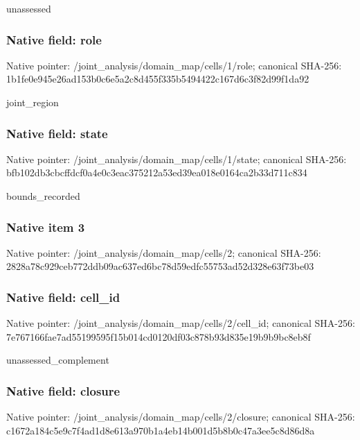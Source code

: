 \documentclass[10pt,a4paper]{article}
\begin{document}
\begingroup\raggedright\sloppy unassessed\par\endgroup

\subsubsection{Native field: role}
Native pointer: /joint\_\allowbreak{}analysis/domain\_\allowbreak{}map/cells/1/role; canonical SHA-256: 1b1fe0e945e26ad153b0c6e5a2c8d455f335b5494422c167d6c3f82d99f1da92

\begingroup\raggedright\sloppy joint\_\allowbreak{}region\par\endgroup

\subsubsection{Native field: state}
Native pointer: /joint\_\allowbreak{}analysis/domain\_\allowbreak{}map/cells/1/state; canonical SHA-256: bfb102db3cbcffdcf0a4e0c3eac375212a53ed39ea018e0164ca2b33d711c834

\begingroup\raggedright\sloppy bounds\_\allowbreak{}recorded\par\endgroup

\subsubsection{Native item 3}
Native pointer: /joint\_\allowbreak{}analysis/domain\_\allowbreak{}map/cells/2; canonical SHA-256: 2828a78c929ceb772ddb09ac637ed6bc78d59edfc55753ad52d328e63f73be03

\subsubsection{Native field: cell\_\allowbreak{}id}
Native pointer: /joint\_\allowbreak{}analysis/domain\_\allowbreak{}map/cells/2/cell\_\allowbreak{}id; canonical SHA-256: 7e767166fae7ad55199595f15b014cd0120df03c878b93d835e19b9b9bc8eb8f

\begingroup\raggedright\sloppy unassessed\_\allowbreak{}complement\par\endgroup

\subsubsection{Native field: closure}
Native pointer: /joint\_\allowbreak{}analysis/domain\_\allowbreak{}map/cells/2/closure; canonical SHA-256: c1672a184c5e9c7f4ad1d8e613a970b1a4eb14b001d5b8b0c47a3ee5c8d86d8a
\end{document}
